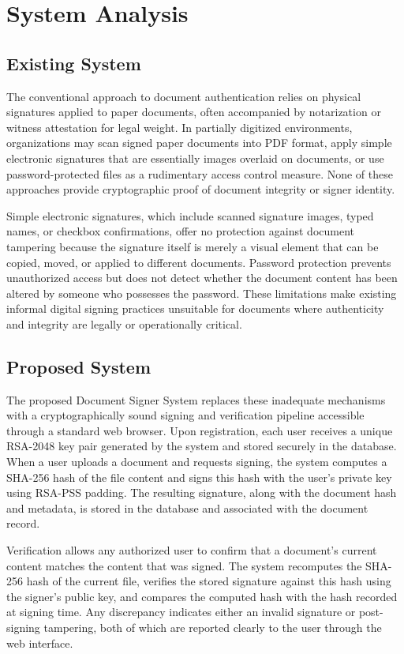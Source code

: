 \chapter{System Analysis}

\section{Existing System}

The conventional approach to document authentication relies on physical signatures applied to paper documents, often accompanied by notarization or witness attestation for legal weight. In partially digitized environments, organizations may scan signed paper documents into PDF format, apply simple electronic signatures that are essentially images overlaid on documents, or use password-protected files as a rudimentary access control measure. None of these approaches provide cryptographic proof of document integrity or signer identity.

Simple electronic signatures, which include scanned signature images, typed names, or checkbox confirmations, offer no protection against document tampering because the signature itself is merely a visual element that can be copied, moved, or applied to different documents. Password protection prevents unauthorized access but does not detect whether the document content has been altered by someone who possesses the password. These limitations make existing informal digital signing practices unsuitable for documents where authenticity and integrity are legally or operationally critical.

\section{Proposed System}

The proposed Document Signer System replaces these inadequate mechanisms with a cryptographically sound signing and verification pipeline accessible through a standard web browser. Upon registration, each user receives a unique RSA-2048 key pair generated by the system and stored securely in the database. When a user uploads a document and requests signing, the system computes a SHA-256 hash of the file content and signs this hash with the user's private key using RSA-PSS padding. The resulting signature, along with the document hash and metadata, is stored in the database and associated with the document record.

Verification allows any authorized user to confirm that a document's current content matches the content that was signed. The system recomputes the SHA-256 hash of the current file, verifies the stored signature against this hash using the signer's public key, and compares the computed hash with the hash recorded at signing time. Any discrepancy indicates either an invalid signature or post-signing tampering, both of which are reported clearly to the user through the web interface.


